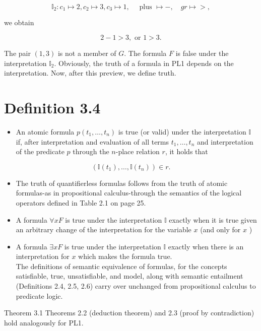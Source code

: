 \documentclass[10pt]{article}
\begin{document}
$$
\mathbb{I}_{2}: c_{1} \mapsto 2, c_{2} \mapsto 3, c_{3} \mapsto 1, \quad \text { plus } \mapsto-, \quad g r \mapsto>,
$$

we obtain

$$
2-1>3, \text { or } 1>3 .
$$

The pair $(1,3)$ is not a member of $G$. The formula $F$ is false under the interpretation $\mathbb{I}_{2}$. Obviously, the truth of a formula in PL1 depends on the interpretation. Now, after this preview, we define truth.

\section*{Definition 3.4}
\begin{itemize}
  \item An atomic formula $p\left(t_{1}, \ldots, t_{n}\right)$ is true (or valid) under the interpretation $\mathbb{I}$ if, after interpretation and evaluation of all terms $t_{1}, \ldots, t_{n}$ and interpretation of the predicate $p$ through the $n$-place relation $r$, it holds that
\end{itemize}


$$
\left(\mathbb{I}\left(t_{1}\right), \ldots, \mathbb{I}\left(t_{n}\right)\right) \in r .
$$

\begin{itemize}
  \item The truth of quantifierless formulas follows from the truth of atomic formulas-as in propositional calculus-through the semantics of the logical operators defined in Table 2.1 on page 25.
  \item A formula $\forall x F$ is true under the interpretation $\mathbb{I}$ exactly when it is true given an arbitrary change of the interpretation for the variable $x$ (and only for $x$ )
  \item A formula $\exists x F$ is true under the interpretation $\mathbb{I}$ exactly when there is an interpretation for $x$ which makes the formula true.\\
The definitions of semantic equivalence of formulas, for the concepts satisfiable, true, unsatisfiable, and model, along with semantic entailment (Definitions 2.4, 2.5, 2.6) carry over unchanged from propositional calculus to predicate logic.
\end{itemize}

Theorem 3.1 Theorems 2.2 (deduction theorem) and 2.3 (proof by contradiction) hold analogously for PL1.
\end{document}
